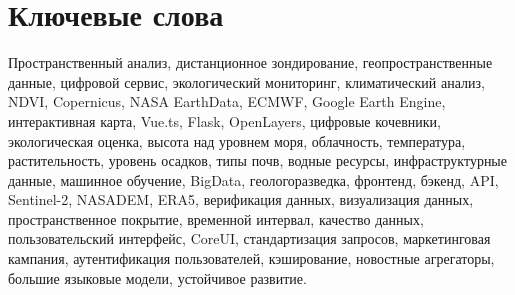 \chapter*{Ключевые слова}
Пространственный анализ, дистанционное зондирование, геопространственные данные, цифровой сервис, экологический мониторинг, климатический анализ, NDVI, Copernicus, NASA EarthData, ECMWF, Google Earth Engine, интерактивная карта, Vue.ts, Flask, OpenLayers, цифровые кочевники, экологическая оценка, высота над уровнем моря, облачность, температура, растительность, уровень осадков, типы почв, водные ресурсы, инфраструктурные данные, машинное обучение, BigData, геологоразведка, фронтенд, бэкенд, API, Sentinel-2, NASADEM, ERA5, верификация данных, визуализация данных, пространственное покрытие, временной интервал, качество данных, пользовательский интерфейс, CoreUI, стандартизация запросов, маркетинговая кампания, аутентификация пользователей, кэширование, новостные агрегаторы, большие языковые модели, устойчивое развитие.